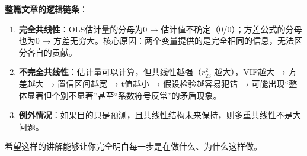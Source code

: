 \documentclass[12pt,a4paper]{ctexart}
\begin{document}
\vspace{1em}
\noindent\textbf{整篇文章的逻辑链条}：

\begin{enumerate}
    \item \textbf{完全共线性}：OLS估计量的分母为0 → 估计值不确定（0/0）；方差公式的分母也为0 → 方差无穷大。核心原因：两个变量提供的是完全相同的信息，无法区分各自的贡献。
    \item \textbf{不完全共线性}：估计量可以计算，但共线性越强（$r_{23}^2$ 越大），VIF越大 → 方差越大 → 置信区间越宽 → t值越小 → 假设检验越容易犯错 → 可能出现“整体显著但个别不显著”甚至“系数符号反常”的矛盾现象。
    \item \textbf{例外情况}：如果目的只是预测，且共线性结构未来保持，则多重共线性不是大问题。
\end{enumerate}

希望这样的讲解能够让你完全明白每一步是在做什么、为什么这样做。
\end{document}
